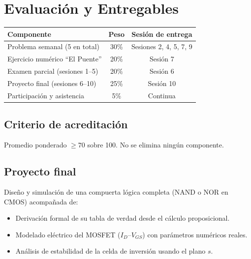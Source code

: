 \documentclass[11pt, letterpaper]{article}
\begin{document}
\newpage

\section{Evaluación y Entregables}

\begin{center}
\begin{tabular}{lcc}
\toprule
\textbf{Componente} & \textbf{Peso} & \textbf{Sesión de entrega} \\
\midrule
Problema semanal (5 en total) & 30\% & Sesiones 2, 4, 5, 7, 9 \\
Ejercicio numérico ``El Puente'' & 20\% & Sesión 7 \\
Examen parcial (sesiones 1–5)   & 20\% & Sesión 6 \\
Proyecto final (sesiones 6–10)  & 25\% & Sesión 10 \\
Participación y asistencia       & 5\%  & Continua \\
\bottomrule
\end{tabular}
\end{center}

\subsection*{Criterio de acreditación}
Promedio ponderado $\geq 70$ sobre 100. No se elimina ningún componente.

\subsection*{Proyecto final}
Diseño y simulación de una compuerta lógica completa (NAND o NOR en CMOS) acompañada de:
\begin{itemize}
  \item Derivación formal de su tabla de verdad desde el cálculo proposicional.
  \item Modelado eléctrico del MOSFET ($I_D$--$V_{GS}$) con parámetros numéricos reales.
  \item Análisis de estabilidad de la celda de inversión usando el plano $s$.
\end{itemize}

\newpage

\end{document}
